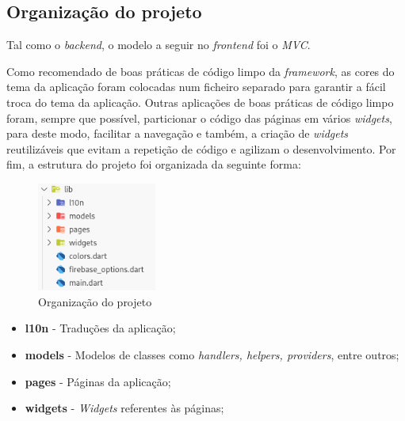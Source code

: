 \subsection{Organização do projeto}
Tal como o \textit{backend}, o modelo a seguir no \textit{frontend} foi o \textit{MVC}. 

Como recomendado de boas práticas de código limpo da \textit{framework}, as cores do tema da aplicação foram colocadas num ficheiro separado para garantir a fácil troca do tema da aplicação. Outras aplicações de boas práticas de código limpo foram, sempre que possível, particionar o código das páginas em vários \textit{widgets}, para deste modo, facilitar a navegação e também, a criação de \textit{widgets} reutilizáveis que evitam a repetição de código e agilizam o desenvolvimento. Por fim, a estrutura do projeto foi organizada da seguinte forma:
\begin{figure}[htb]
 \centering
 \includegraphics[width=0.35\textwidth]{images/implementacao/frontend/organizacao_projeto.png}
 \caption{Organização do projeto}
 \label{fig:69}
\end{figure}

\begin{itemize}
 \item \textbf{l10n} - Traduções da aplicação;
 \item \textbf{models} - Modelos de classes como \textit{handlers, helpers, providers}, entre outros;
 \item \textbf{pages} - Páginas da aplicação;
 \item \textbf{widgets} - \textit{Widgets} referentes às páginas;
\end{itemize}
\vspace{50mm}


